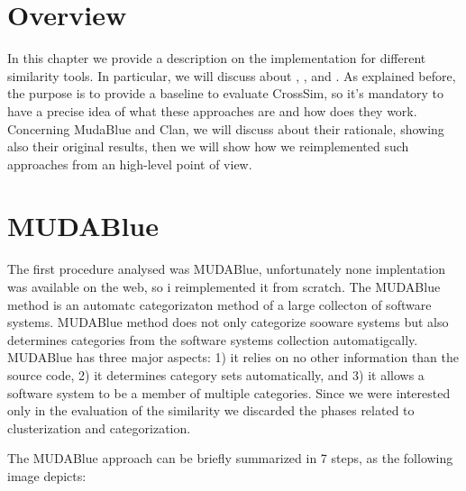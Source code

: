 


\section{Overview}

In this chapter we provide a description on the implementation for different similarity tools. In particular, we will discuss about \MUDABlue, \CLAN, \RepoPal and \CrossSim. As explained before, the purpose is to provide a baseline to evaluate CrossSim, so it's mandatory to have a precise idea of what these approaches are and how does they work. Concerning MudaBlue and Clan, we will discuss about their rationale, showing also their original results, then we will show how we reimplemented such approaches from an high-level point of view.


\section{MUDABlue}

The first procedure analysed was MUDABlue, unfortunately none implentation was available on the web, so i reimplemented it from scratch. The MUDABlue method is an automatc categorizaton method of a large collecton of software systems. MUDABlue method does not only categorize sooware systems but also determines categories from the software systems collection automatigcally. MUDABlue has three major aspects: 1) it relies on no other information than the source code, 2) it determines category sets automatically, and 3) it allows a software system to be a member of multiple categories. Since we were interested only in the evaluation of the similarity we discarded the phases related to clusterization and categorization.

The MUDABlue approach can be briefly summarized in 7 steps, as the following image depicts:


